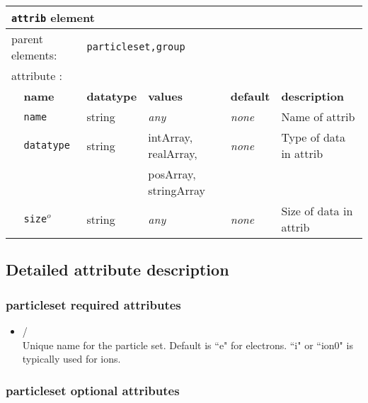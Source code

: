 \begin{table}[h]
\begin{center}
\begin{tabularx}{\textwidth}{l l l l l X }
\hline
\multicolumn{6}{l}{\texttt{attrib} element} \\
\hline
\multicolumn{2}{l}{parent elements:} & \multicolumn{4}{l}{\texttt{particleset,group}}\\
\multicolumn{2}{l}{attribute      :} & \multicolumn{4}{l}{}\\
   &   \bfseries name            & \bfseries datatype & \bfseries values & \bfseries default   & \bfseries description \\
   &   \texttt{name}             &  string            &  \textit{any}    &  \textit{none}    & Name of attrib              \\
   &   \texttt{datatype}         &  string            &  intArray, realArray, &  \textit{none} & Type of data in attrib \\
   &                             &                    &  posArray, stringArray &             &                        \\
   &   \texttt{size}$^o$         &  string            &  \textit{any}    &  \textit{none}    & Size of data in attrib \\
  \hline
  \hline
\end{tabularx}
\end{center}
\end{table}

\subsection{Detailed attribute description}

\subsubsection{particleset required attributes}

\begin{itemize}
\item {}/ \\
Unique name for the particle set. Default is ``e" for electrons. ``i" or ``ion0" is typically used for ions. 
\end{itemize}

\subsubsection{particleset optional attributes}

